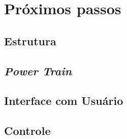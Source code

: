 \section{Próximos passos}
  \subsection{Estrutura}
  \subsection{\textit{Power Train}}
  \subsection{Interface com Usuário}
  \subsection{Controle}
